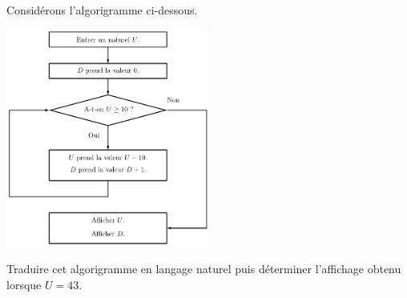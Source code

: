 Considérons l'algorigramme ci-dessous.
\begin{center}
    \includegraphics[width=0.5\textwidth]{reading/draw/while_loop.pdf}
\end{center}
Traduire cet algorigramme en langage naturel puis déterminer l'affichage obtenu lorsque $U = 43$.
